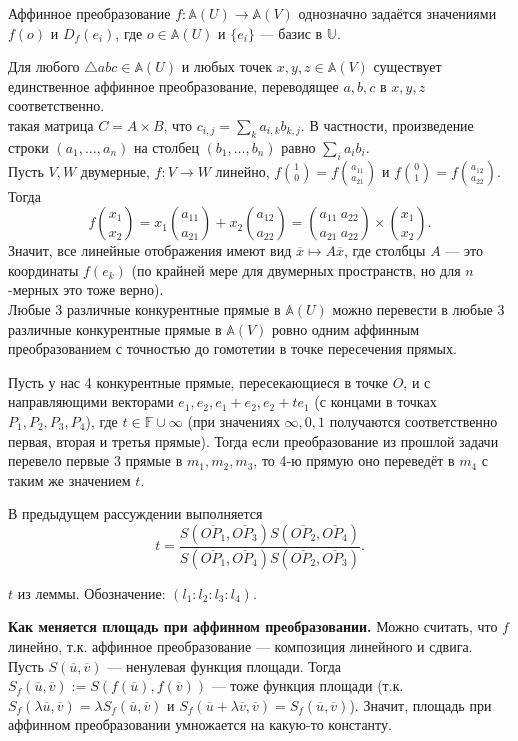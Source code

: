 \documentclass[12pt,a4paper]{article}
\begin{document}
\lemma Аффинное преобразование $f:\mathbb A(U)\to \mathbb A(V)$ однозначно задаётся значениями $f(o)$ и $D_f(e_i)$, где $o\in \mathbb A(U)$ и $\{e_i\}$ --- базис в $\mathbb U$.

\newpage

\lemma Для любого $\triangle abc\in \mathbb A(U)$ и любых точек $x,y,z\in \mathbb A(V)$ существует единственное аффинное преобразование, переводящее $a,b,c$ в $x,y,z$ соответственно.\\

 такая матрица $C=A\times B$, что $c_{i,j}=\sum_k a_{i,k}b_{k,j}$. В частности, произведение строки $(a_1,\ldots ,a_n)$ на столбец $(b_1,\ldots ,b_n)$ равно $\sum_i a_ib_i$.\\

Пусть $V,W$ двумерные, $f:V\to W$ линейно, $f\binom10=f\binom{a_{11}}{a_{21}}$ и $f\binom 01=f\binom{a_{12}}{a_{22}}$. Тогда \[
	f\binom {x_1}{x_2}=x_1\binom{a_{11}}{a_{21}}+x_2\binom{a_{12}}{a_{22}}=\binom{a_{11}\ a_{22}}{a_{21}\ a_{22}}\times \binom{x_1}{x_2}.
\] Значит, все линейные отображения имеют вид $\overline{x}\mapsto A\overline{x}$, где столбцы $A$ --- это координаты $f(e_k)$ (по крайней мере для двумерных пространств, но для $n$-мерных это тоже верно).\\

\lemma Любые 3 различные конкурентные прямые в $\mathbb A(U)$ можно перевести в любые 3 различные конкурентные прямые в $\mathbb A(V)$ ровно одним аффинным преобразованием с точностью до гомотетии в точке пересечения прямых.

Пусть у нас 4 конкурентные прямые, пересекающиеся в точке $O$, и с направляющими векторами $e_1,e_2,e_1+e_2,e_2+te_1$ (с концами в точках $P_1,P_2,P_3,P_4$), где $t\in\mathbb F\cup \infty$ (при значениях $\infty,0,1$ получаются соответственно первая, вторая и третья прямые). Тогда если преобразование из прошлой задачи перевело первые 3 прямые в $m_1,m_2,m_3$, то 4-ю прямую оно переведёт в $m_4$ с таким же значением $t$.

\lemma В предыдущем рассуждении выполняется \[
	t=\frac{S(\overline{OP_1},\overline{OP_3})S(\overline{OP_2},\overline{OP_4})}{S(\overline{OP_1},\overline{OP_4})S(\overline{OP_2},\overline{OP_3})}.
\]

 $t$ из леммы. Обозначение: $(l_1:l_2:l_3:l_4)$.

\textbf{Как меняется площадь при аффинном преобразовании.} Можно считать, что $f$ линейно, т.к. аффинное преобразование --- композиция линейного и сдвига. Пусть $S(\overline{u},\overline{v})$ --- ненулевая функция площади. Тогда $S_f(\overline{u},\overline{v}):=S(f(\overline{u}),f(\overline{v}))$ --- тоже функция площади (т.к. $S_f(\lambda\overline{u},\overline{v})=\lambda S_f(\overline{u},\overline{v})$ и $S_f(\overline{u}+\lambda\overline{v},\overline{v})=S_f(\overline{u},\overline{v})$). Значит, площадь при аффинном преобразовании умножается на какую-то константу.
\end{document}

